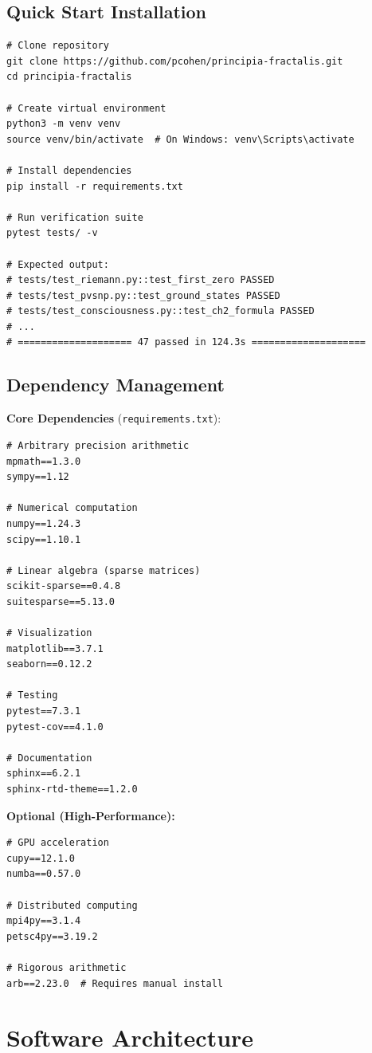 \subsection{Quick Start Installation}

\begin{verbatim}
# Clone repository
git clone https://github.com/pcohen/principia-fractalis.git
cd principia-fractalis

# Create virtual environment
python3 -m venv venv
source venv/bin/activate  # On Windows: venv\Scripts\activate

# Install dependencies
pip install -r requirements.txt

# Run verification suite
pytest tests/ -v

# Expected output:
# tests/test_riemann.py::test_first_zero PASSED
# tests/test_pvsnp.py::test_ground_states PASSED
# tests/test_consciousness.py::test_ch2_formula PASSED
# ...
# ==================== 47 passed in 124.3s ====================
\end{verbatim}

\subsection{Dependency Management}

\textbf{Core Dependencies} (\texttt{requirements.txt}):
\begin{verbatim}
# Arbitrary precision arithmetic
mpmath==1.3.0
sympy==1.12

# Numerical computation
numpy==1.24.3
scipy==1.10.1

# Linear algebra (sparse matrices)
scikit-sparse==0.4.8
suitesparse==5.13.0

# Visualization
matplotlib==3.7.1
seaborn==0.12.2

# Testing
pytest==7.3.1
pytest-cov==4.1.0

# Documentation
sphinx==6.2.1
sphinx-rtd-theme==1.2.0
\end{verbatim}

\textbf{Optional (High-Performance):}
\begin{verbatim}
# GPU acceleration
cupy==12.1.0
numba==0.57.0

# Distributed computing
mpi4py==3.1.4
petsc4py==3.19.2

# Rigorous arithmetic
arb==2.23.0  # Requires manual install
\end{verbatim}

\section{Software Architecture}
\label{sec:architecture}

